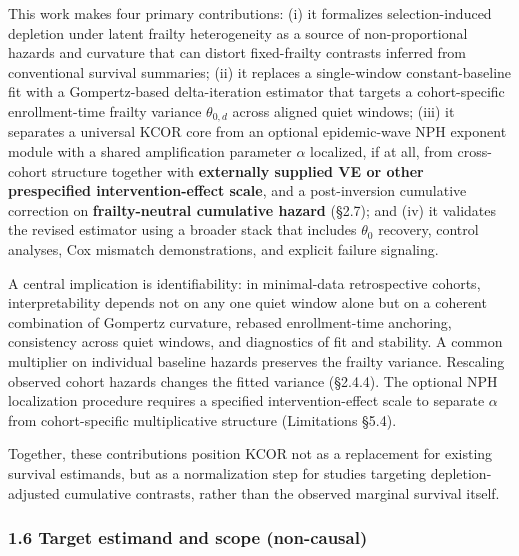 \documentclass[
]{article}
\begin{document}
This work makes four primary contributions: (i) it formalizes selection-induced depletion under latent frailty heterogeneity as a source of non-proportional hazards and curvature that can distort fixed-frailty contrasts inferred from conventional survival summaries; (ii) it replaces a single-window constant-baseline fit with a Gompertz-based delta-iteration estimator that targets a cohort-specific enrollment-time frailty variance \(\theta_{0,d}\) across aligned quiet windows; (iii) it separates a universal KCOR core from an optional epidemic-wave NPH exponent module with a shared amplification parameter \(\alpha\) localized, if at all, from cross-cohort structure together with \textbf{externally supplied VE or other prespecified intervention-effect scale}, and a post-inversion cumulative correction on \textbf{frailty-neutral cumulative hazard} (§2.7); and (iv) it validates the revised estimator using a broader stack that includes \(\theta_0\) recovery, control analyses, Cox mismatch demonstrations, and explicit failure signaling.

A central implication is identifiability: in minimal-data retrospective cohorts, interpretability depends not on any one quiet window alone but on a coherent combination of Gompertz curvature, rebased enrollment-time anchoring, consistency across quiet windows, and diagnostics of fit and stability. A common multiplier on individual baseline hazards preserves the frailty variance. Rescaling observed cohort hazards changes the fitted variance (§2.4.4). The optional NPH localization procedure requires a specified intervention-effect scale to separate \(\alpha\) from cohort-specific multiplicative structure (Limitations §5.4).

Together, these contributions position KCOR not as a replacement for existing survival estimands, but as a normalization step for studies targeting depletion-adjusted cumulative contrasts, rather than the observed marginal survival itself.

\subsubsection{1.6 Target estimand and scope (non-causal)}\label{target-estimand-and-scope-non-causal}
\end{document}
